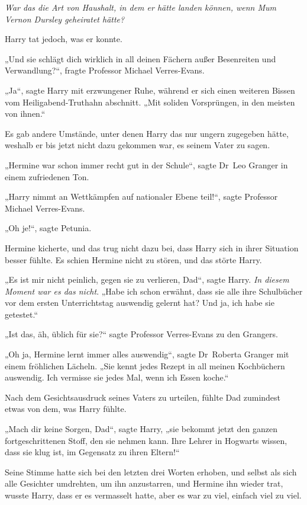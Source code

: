 {\emph{War das die Art von Haushalt, in dem er hätte landen können, wenn Mum Vernon Dursley geheiratet hätte?}

Harry tat jedoch, was er konnte.

„Und sie schlägt dich wirklich in all deinen Fächern außer Besenreiten und Verwandlung?“, fragte Professor Michael Verres-Evans.

„Ja“, sagte Harry mit erzwungener Ruhe, während er sich einen weiteren Bissen vom Heiligabend-Truthahn abschnitt. „Mit soliden Vorsprüngen, in den meisten von ihnen.“

Es gab andere Umstände, unter denen Harry das nur ungern zugegeben hätte, weshalb er bis jetzt nicht dazu gekommen war, es seinem Vater zu sagen.

„Hermine war schon immer recht gut in der Schule“, sagte Dr~Leo Granger in einem zufriedenen Ton.

„Harry nimmt an Wettkämpfen auf nationaler Ebene teil!“, sagte Professor Michael Verres-Evans.

„Oh je!“, sagte Petunia.

Hermine kicherte, und das trug nicht dazu bei, dass Harry sich in ihrer Situation besser fühlte. Es schien Hermine nicht zu stören, und das störte Harry.

„Es ist mir nicht peinlich, gegen sie zu verlieren, Dad“, sagte Harry. \emph{In diesem Moment war es das nicht}. „Habe ich schon erwähnt, dass sie alle ihre Schulbücher vor dem ersten Unterrichtstag auswendig gelernt hat? Und ja, ich habe sie getestet.“

„Ist das, äh, üblich für sie?“ sagte Professor Verres-Evans zu den Grangers.

„Oh ja, Hermine lernt immer alles auswendig“, sagte Dr~Roberta Granger mit einem fröhlichen Lächeln. „Sie kennt jedes Rezept in all meinen Kochbüchern auswendig. Ich vermisse sie jedes Mal, wenn ich Essen koche.“

Nach dem Gesichtsausdruck seines Vaters zu urteilen, fühlte Dad zumindest etwas von dem, was Harry fühlte.

„Mach dir keine Sorgen, Dad“, sagte Harry, „sie bekommt jetzt den ganzen fortgeschrittenen Stoff, den sie nehmen kann. Ihre Lehrer in Hogwarts wissen, dass sie klug ist, im Gegensatz zu ihren Eltern!“

Seine Stimme hatte sich bei den letzten drei Worten erhoben, und selbst als sich alle Gesichter umdrehten, um ihn anzustarren, und Hermine ihn wieder trat, wusste Harry, dass er es vermasselt hatte, aber es war zu viel, einfach viel zu viel.

}

